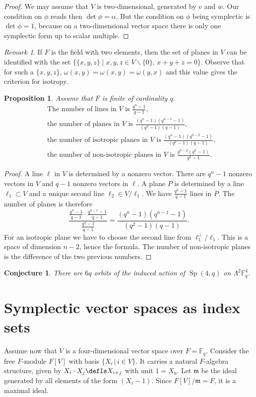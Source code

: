 \documentclass{amsart}
\DeclareMathOperator{\Sp}{Sp}
\theoremstyle{plain}
\newtheorem{proposition}[theorem]{Proposition}
\newtheorem{conjecture}[theorem]{Conjecture}
\theoremstyle{definition}
\theoremstyle{remark}
\newtheorem{remark}[theorem]{Remark}
\begin{document}
\begin{proof}
We may assume that $V$ is two-dimensional, generated by $v$ and $w$. Our condition on $\phi$ reads then $\det\phi = \alpha$. But the condition on $\phi$ being symplectic is $\det\phi = 1$, because on a two-dimensional vector space there is only one symplectic form up to scalar multiple. 
\end{proof}
\begin{remark}
 If $F$ is the field with two elements, then the set of planes in $V$ can be identified with the set $\{\{x,y,z\}\;|\;x,y,z\in V\backslash\{0\},\,x+y+z=0\}$. Observe that for such a $\{x,y,z\}$, $\omega(x,y)=\omega(x,y)=\omega(y,x)$ and this value gives the criterion for isotropy.
\end{remark}

\begin{proposition} Assume that $F$ is finite of cardinality $q$.
\begin{align}
&\text{The number of lines in $V$ is }\frac{q^n-1}{q-1}, \\
&\text{the number of planes in $V$ is }\frac{(q^n-1)(q^{n-1}-1)}{(q^2-1)(q-1)}, \\
&\text{the number of isotropic planes in $V$ is }\frac{(q^n-1)(q^{n-2}-1)}{(q^2-1)(q-1)}, \\
&\text{the number of non-isotropic planes in $V$ is }\frac{q^{n-2}(q^n-1)}{q^2-1}.
\end{align}
\end{proposition}
\begin{proof}
A line $\ell$ in $V$ is determined by a nonzero vector. There are $q^n - 1$ nonzero vectors in $V$ and $q-1$ nonzero vectors in $\ell$. A plane $P$ is determined by a line $\ell_1 \subset V$ and a unique second line $\ell_2\in V/\ell_1$. We have $\frac{q^2-1}{q-1}$ lines in $P$. The number of planes is therefore
$$
\frac{ \frac{q^n-1}{q-1} \cdot\frac{q^{n-1}-1}{q-1}}{\frac{q^2-1}{q-1} } = \frac{(q^n-1)(q^{n-1}-1)}{(q^2-1)(q-1)}.
$$
For an isotropic plane we have to choose the second line from $\ell_1^\perp/\ell_1$. This is a space of dimension $n-2$, hence the formula. The number of non-isotropic planes is the difference of the two previous numbers.
\end{proof}
\begin{conjecture}
There are $6q$ orbits of the induced action of $\Sp(4,q)$ on $\Lambda^2 \mathbb{F}_q^4$.
\end{conjecture}

\section{Symplectic vector spaces as index sets}
Assume now that $V$ is a four-dimensional vector space over $F=\mathbb F_q$. Consider the free $F$-module $F[V]$ with basis $\{X_i \,|\, i\in V\}$. It carries a natural $F$-algebra structure, given by
$X_i\cdot X_j \defIs  X_{i+j}$ with unit $1=X_0$. Let $\mathfrak m $ be the ideal generated by all elements of the form $(X_i-1)$.
Since $F[V]/\mathfrak m = F$, it is a maximal ideal.
\end{document}

